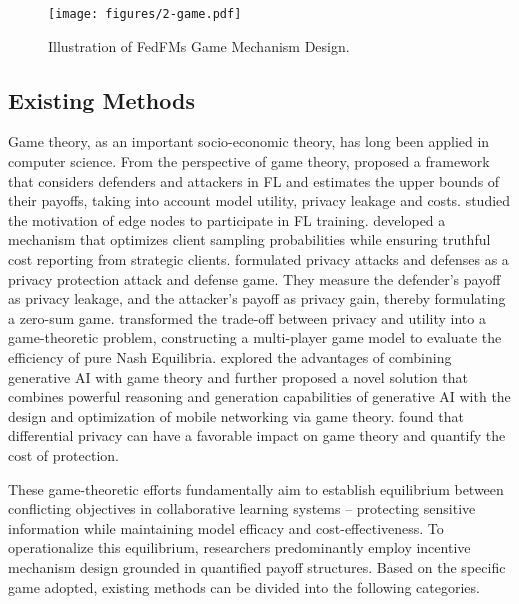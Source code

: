 \begin{figure}[htbp]
    \centering
    \texttt{[image: figures/2-game.pdf]}
    \captionsetup{justification=centering}
    \caption{Illustration of FedFMs Game Mechanism Design.}
    \label{fig:game_mechanism_design}
    \vspace{-5mm}
\end{figure}





\subsection{Existing Methods}

Game theory, as an important socio-economic theory, has long been applied in computer science. From the perspective of game theory, \citet{zhang2024game} proposed a framework that considers defenders and attackers in FL and estimates the upper bounds of their payoffs, taking into account model utility, privacy leakage and costs. \citet{zhan2020learning} studied the motivation of edge nodes to participate in FL training. \citet{liao2024optimal} developed a mechanism that optimizes client sampling probabilities while ensuring truthful cost reporting from strategic clients. \citet{wu2020privacy} formulated privacy attacks and defenses as a privacy protection attack and defense game. They measure the defender’s payoff as privacy leakage, and the attacker’s payoff as privacy gain, thereby formulating a zero-sum game. \citet{wu2017game} transformed the trade-off between privacy and utility into a game-theoretic problem, constructing a multi-player game model to evaluate the efficiency of pure Nash Equilibria. \citet{he2024generative} explored the advantages of combining generative AI with game theory and further proposed a novel solution that combines powerful reasoning and generation capabilities of generative AI with the design and optimization of mobile networking via game theory. \citet{zhang2021more} found that differential privacy can have a favorable impact on game theory and quantify the cost of protection.


These game-theoretic efforts fundamentally aim to establish equilibrium between conflicting objectives in collaborative learning systems – protecting sensitive information while maintaining model efficacy and cost-effectiveness. To operationalize this equilibrium, researchers predominantly employ incentive mechanism design grounded in quantified payoff structures.
Based on the specific game adopted, existing methods can be divided into the following categories. 

